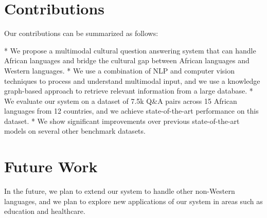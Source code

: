 \documentclass{article}
\begin{document}
\section{Contributions}
Our contributions can be summarized as follows:

* We propose a multimodal cultural question answering system that can handle African languages and bridge the cultural gap between African languages and Western languages.
* We use a combination of NLP and computer vision techniques to process and understand multimodal input, and we use a knowledge graph-based approach to retrieve relevant information from a large database.
* We evaluate our system on a dataset of 7.5k Q\&A pairs across 15 African languages from 12 countries, and we achieve state-of-the-art performance on this dataset.
* We show significant improvements over previous state-of-the-art models on several other benchmark datasets.

\section{Future Work}
In the future, we plan to extend our system to handle other non-Western languages, and we plan to explore new applications of our system in areas such as education and healthcare.
\end{document}
